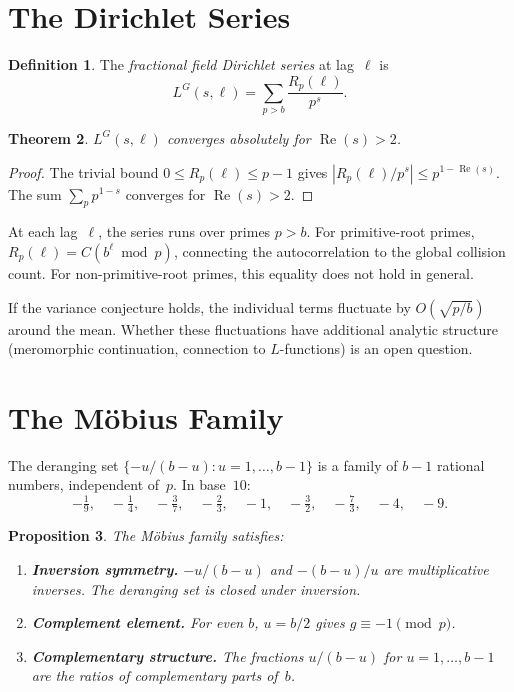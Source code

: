 \documentclass[12pt]{amsart}
\newtheorem{theorem}{Theorem}
\newtheorem{proposition}[theorem]{Proposition}
\theoremstyle{definition}
\newtheorem{definition}[theorem]{Definition}
\theoremstyle{remark}
\begin{document}
\section{The Dirichlet Series}

\begin{definition}
The \emph{fractional field Dirichlet series} at lag~$\ell$ is
\[
L^{G}(s, \ell) = \sum_{p > b} \frac{R_p(\ell)}{p^s}.
\]
\end{definition}

\begin{theorem}\label{thm:convergence}
$L^{G}(s, \ell)$ converges absolutely for
$\operatorname{Re}(s) > 2$.
\end{theorem}

\begin{proof}
The trivial bound $0 \le R_p(\ell) \le p - 1$ gives
$|R_p(\ell) / p^s| \le p^{1-\operatorname{Re}(s)}$.
The sum $\sum_p p^{1-s}$ converges for
$\operatorname{Re}(s) > 2$.
\end{proof}

At each lag~$\ell$, the series runs over primes $p > b$.
For primitive-root primes,
$R_p(\ell) = C(b^{\ell} \bmod p)$, connecting the
autocorrelation to the global collision count. For
non-primitive-root primes, this equality does not hold
in general.

If the variance conjecture holds, the individual terms
fluctuate by $O(\sqrt{p/b})$ around the mean. Whether
these fluctuations have additional analytic structure
(meromorphic continuation, connection to $L$-functions)
is an open question.

\section{The M\"obius Family}

The deranging set $\{-u/(b{-}u) : u = 1, \ldots, b{-}1\}$ is a
family of $b - 1$ rational numbers, independent of~$p$.
In base~$10$:
\[
-\tfrac{1}{9},\quad -\tfrac{1}{4},\quad -\tfrac{3}{7},\quad
-\tfrac{2}{3},\quad -1,\quad -\tfrac{3}{2},\quad
-\tfrac{7}{3},\quad -4,\quad -9.
\]

\begin{proposition}\label{prop:mobius-structure}
The M\"obius family satisfies:
\begin{enumerate}
\item \textbf{Inversion symmetry.} $-u/(b{-}u)$ and
      $-(b{-}u)/u$ are multiplicative inverses. The deranging
      set is closed under inversion.
\item \textbf{Complement element.} For even $b$, $u = b/2$
      gives $g \equiv -1 \pmod{p}$.
\item \textbf{Complementary structure.} The fractions $u/(b{-}u)$ for
      $u = 1, \ldots, b{-}1$ are the ratios of complementary
      parts of~$b$.
\end{enumerate}
\end{proposition}
\end{document}
